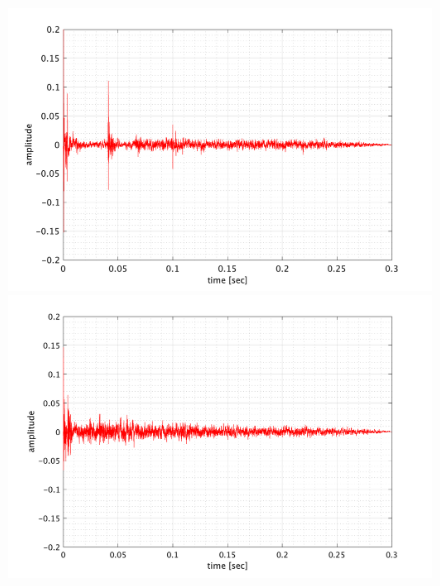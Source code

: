 \documentclass[11pt,a4j]{jreport}
\begin{document}
\begin{figure}[H]
  \begin{minipage}[b]{.5\linewidth}
    \centering
    \includegraphics[width=.8\linewidth]{images/convolutedIr/ER1.png}
  \end{minipage}%
  \begin{minipage}[b]{.5\linewidth}
    \centering
    \includegraphics[width=.8\linewidth]{images/convolutedIr/ER2.png}
  \end{minipage}


\end{figure}
\end{document}
